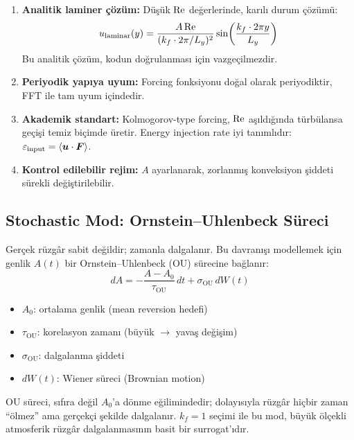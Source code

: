 \begin{enumerate}
    \item \textbf{Analitik laminer çözüm:} Düşük $\mathrm{Re}$ değerlerinde, karılı durum çözümü:
    \begin{equation}
        u_{\text{laminar}}(y) = \frac{A \, \mathrm{Re}}{(k_f \cdot 2\pi / L_y)^2} \sin\!\left(\frac{k_f \cdot 2\pi y}{L_y}\right)
        \label{eq:kolmogorov_laminar}
    \end{equation}
    Bu analitik çözüm, kodun doğrulanması için vazgeçilmezdir.

    \item \textbf{Periyodik yapıya uyum:} Forcing fonksiyonu doğal olarak periyodiktir, FFT ile tam uyum içindedir.

    \item \textbf{Akademik standart:} Kolmogorov-type forcing, $\mathrm{Re}$ aşıldığında türbülansa geçişi temiz biçimde üretir. Energy injection rate iyi tanımlıdır: $\varepsilon_{\text{input}} = \langle \bm{u} \cdot \bm{F} \rangle$.

    \item \textbf{Kontrol edilebilir rejim:} $A$ ayarlanarak, zorlanmış konveksiyon şiddeti sürekli değiştirilebilir.
\end{enumerate}

\subsection{Stochastic Mod: Ornstein--Uhlenbeck Süreci}

Gerçek rüzgâr sabit değildir; zamanla dalgalanır. Bu davranışı modellemek için genlik $A(t)$ bir Ornstein--Uhlenbeck (OU) sürecine bağlanır:
\begin{equation}
    dA = -\frac{A - A_0}{\tau_{\text{OU}}} \, dt + \sigma_{\text{OU}} \, dW(t)
    \label{eq:ou_process}
\end{equation}
\begin{itemize}
    \item $A_0$: ortalama genlik (mean reversion hedefi)
    \item $\tau_{\text{OU}}$: korelasyon zamanı (büyük $\to$ yavaş değişim)
    \item $\sigma_{\text{OU}}$: dalgalanma şiddeti
    \item $dW(t)$: Wiener süreci (Brownian motion)
\end{itemize}
OU süreci, sıfıra değil $A_0$'a dönme eğilimindedir; dolayısıyla rüzgâr hiçbir zaman ``ölmez'' ama gerçekçi şekilde dalgalanır. $k_f = 1$ seçimi ile bu mod, büyük ölçekli atmosferik rüzgâr dalgalanmasının basit bir surrogat'ıdır.

